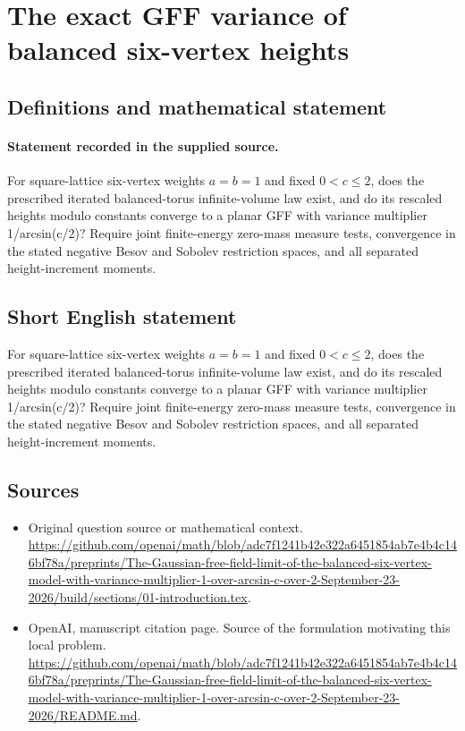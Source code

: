\documentclass[11pt]{article}
\begin{document}
\section*{The exact GFF variance of balanced six-vertex heights}\label{30007345}
\subsection{Definitions and mathematical statement}
\paragraph{Statement recorded in the supplied source.}
For square-lattice six-vertex weights $a=b=1$ and fixed $0<c\leq 2$, does the prescribed iterated balanced-torus infinite-volume law exist, and do its rescaled heights modulo constants converge to a planar GFF with variance multiplier 1/arcsin(c/2)? Require joint finite-energy zero-mass measure tests, convergence in the stated negative Besov and Sobolev restriction spaces, and all separated height-increment moments.
\subsection{Short English statement}
For square-lattice six-vertex weights $a=b=1$ and fixed $0<c\leq 2$, does the prescribed iterated balanced-torus infinite-volume law exist, and do its rescaled heights modulo constants converge to a planar GFF with variance multiplier 1/arcsin(c/2)? Require joint finite-energy zero-mass measure tests, convergence in the stated negative Besov and Sobolev restriction spaces, and all separated height-increment moments.
\subsection{Sources}
\begin{itemize}
\item[S1] Original question source or mathematical context.
\url{https://github.com/openai/math/blob/adc7f1241b42e322a6451854ab7e4b4c146bf78a/preprints/The-Gaussian-free-field-limit-of-the-balanced-six-vertex-model-with-variance-multiplier-1-over-arcsin-c-over-2-September-23-2026/build/sections/01-introduction.tex}.
\item[S2] OpenAI, manuscript citation page. Source of the formulation motivating this local problem.
\url{https://github.com/openai/math/blob/adc7f1241b42e322a6451854ab7e4b4c146bf78a/preprints/The-Gaussian-free-field-limit-of-the-balanced-six-vertex-model-with-variance-multiplier-1-over-arcsin-c-over-2-September-23-2026/README.md}.
\end{itemize}
\end{document}
